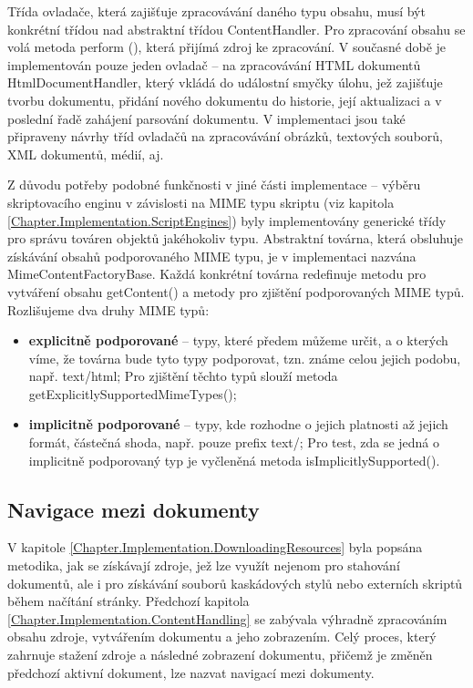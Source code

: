 Třída ovladače, která zajišťuje zpracovávání daného typu obsahu, musí být konkrétní třídou nad abstraktní třídou ContentHandler. Pro zpracování obsahu se volá metoda perform (), která přijímá zdroj ke zpracování. V současné době je implementován pouze jeden ovladač -- na zpracovávání HTML dokumentů HtmlDocumentHandler, který vkládá do událostní smyčky úlohu, jež zajišťuje tvorbu dokumentu, přidání nového dokumentu do historie, její aktualizaci a v poslední řadě zahájení parsování dokumentu. V implementaci jsou také připraveny návrhy tříd ovladačů na zpracovávání obrázků, textových souborů, XML dokumentů, médií, aj.

Z důvodu potřeby podobné funkčnosti v jiné části implementace -- výběru skriptovacího enginu v závislosti na MIME typu skriptu (viz kapitola \ref{Chapter.Implementation.ScriptEngines}) byly implementovány generické třídy pro správu továren objektů jakéhokoliv typu. Abstraktní továrna, která obsluhuje získávání obsahů podporovaného MIME typu, je v implementaci nazvána MimeContentFactoryBase. Každá konkrétní továrna redefinuje metodu pro vytváření obsahu getContent() a metody pro zjištění podporovaných MIME typů. Rozlišujeme dva druhy MIME typů:

\begin{itemize}
  \item \textbf{explicitně podporované} -- typy, které předem můžeme určit, a o kterých víme, že továrna bude tyto typy podporovat, tzn. známe celou jejich podobu, např. text/html; Pro zjištění těchto typů slouží metoda getExplicitlySupportedMimeTypes();
  \item \textbf{implicitně podporované} -- typy, kde rozhodne o jejich platnosti až jejich formát, částečná shoda, např. pouze prefix text/; Pro test, zda se jedná o implicitně podporovaný typ je vyčleněná metoda isImplicitlySupported().
\end{itemize}

\subsection{Navigace mezi dokumenty}
\label{Chapter.Implementation.DocumentNavigation}

V kapitole \ref{Chapter.Implementation.DownloadingResources} byla popsána metodika, jak se získávají zdroje, jež lze využít nejenom pro stahování dokumentů, ale i pro získávání souborů kaskádových stylů nebo externích skriptů během načítání stránky. Předchozí kapitola \ref{Chapter.Implementation.ContentHandling} se zabývala výhradně zpracováním obsahu zdroje, vytvářením dokumentu a jeho zobrazením. Celý proces, který zahrnuje stažení zdroje a následné zobrazení dokumentu, přičemž je změněn předchozí aktivní dokument, lze nazvat navigací mezi dokumenty.

